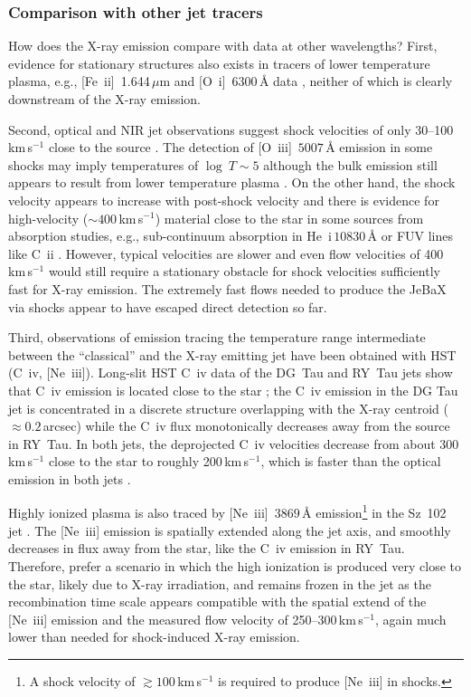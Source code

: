 \subsubsection{Comparison with other jet tracers}
How does the X-ray emission compare with data at other wavelengths? First, 
evidence for stationary structures also exists in tracers of lower temperature plasma, e.g., [Fe~{\sc ii}]~1.644\,$\mu$m  \citep{White_2014} and [O~{\sc i}]~$6300\,$\AA{} data \citep[][]{Schneider_2013a}, neither of which is clearly downstream of the X-ray emission. 

Second, optical and NIR jet observations suggest shock velocities of only 30--100\,km\,s$^{-1}$ close to the source \citep[e.g., ][]{Lavalley_2000, Hartigan_2007}. The detection of [O~{\sc iii}]~$5007\,$\AA{} emission in some shocks may imply temperatures of $\log~T\sim5$ although the bulk emission still appears to result from lower temperature plasma \citep[e.g.,][]{Bacciotti_2011,Nisini_2016}. On the other hand, the shock velocity appears to increase with post-shock velocity and there is evidence for high-velocity ($\sim400\,$km\,s$^{-1}$) material close to the star in some sources from absorption studies, e.g., sub-continuum absorption in He~{\sc i}\,$10830\,$\AA{} \citep[e.g.][]{Edwards_2006} or FUV lines like C~{\sc ii} \citep{Xu_2021}. However, typical velocities are slower and even flow velocities of 400\,km\,s$^{-1}$ would still require a stationary obstacle for shock velocities sufficiently fast for X-ray emission. The extremely fast flows needed to produce the JeBaX via shocks appear to have escaped direct detection so far. 

Third, observations of emission tracing the temperature range intermediate between the ``classical''  and the X-ray emitting jet have been obtained with HST (C~{\sc iv}, [Ne~{\sc iii}]). Long-slit HST C~{\sc iv} data of the DG~Tau and RY~Tau  jets show that C~{\sc iv} emission is located close to the star \cite{Schneider_2013a, Skinner_2018}; the C~{\sc iv} emission in the DG Tau jet is concentrated in a discrete structure overlapping with the X-ray centroid ($\approx0.2$\,arcsec)  while 
the C~{\sc iv} flux monotonically decreases away from the source in RY~Tau. In both jets, the deprojected C~{\sc iv} velocities decrease from about 300\,km\,s$^{-1}$ close to the star to roughly 200\,km\,s$^{-1}$, which is faster than the optical emission in both jets \cite{Schneider_2013a, Skinner_2018}.

Highly ionized plasma is also traced by [Ne~{\sc iii}]~$3869\,$\AA{} emission\footnote{A shock velocity of $\gtrsim100\,$km\,s$^{-1}$ is required to produce [Ne~{\sc iii}] in shocks.} in the Sz~102 jet \citep{Liu_2021}. The [Ne~{\sc iii}] emission is spatially extended along the jet axis, and smoothly decreases in flux away from the star, like the C~{\sc iv} emission in RY~Tau. Therefore, \citet{Liu_2021} prefer a scenario in which the high ionization is produced very close to the star, likely due to X-ray irradiation,  and remains frozen in the jet as the recombination time scale appears compatible with the spatial extend of the [Ne~{\sc iii}] emission and the measured flow velocity of 250--300\,km\,s$^{-1}$, again much lower than needed for shock-induced X-ray emission.

